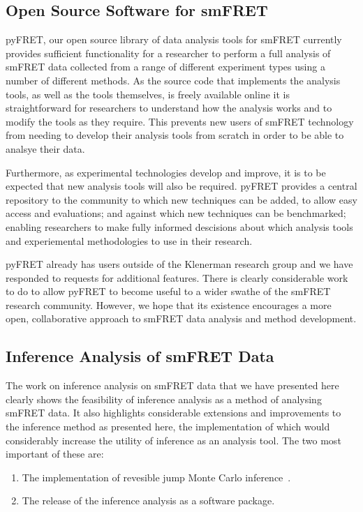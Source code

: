 \subsection{Open Source Software for smFRET}
pyFRET, our open source library of data analysis tools for smFRET currently provides sufficient functionality for a researcher to perform a full analysis of smFRET data collected from a range of different experiment types using a number of different methods. As the source code that implements the analysis tools, as well as the tools themselves, is freely available online it is straightforward for researchers to understand how the analysis works and to modify the tools as they require. This prevents new users of smFRET technology from needing to develop their analysis tools from scratch in order to be able to analsye their data. 

Furthermore, as experimental technologies develop and improve, it is to be expected that new analysis tools will also be required. pyFRET provides a central repository to the community to which new techniques can be added, to allow easy access and evaluations; and against which new techniques can be benchmarked; enabling researchers to make fully informed descisions about which analysis tools and experiemental methodologies to use in their research.

pyFRET already has users outside of the Klenerman research group and we have responded to requests for additional features. There is clearly considerable work to do to allow pyFRET to become useful to a wider swathe of the smFRET research community. However, we hope that its existence encourages a more open, collaborative approach to smFRET data analysis and method development. 

\subsection{Inference Analysis of smFRET Data}
The work on inference analysis on smFRET data that we have presented here clearly shows the feasibility of inference analysis as a method of analysing smFRET data. It also highlights considerable extensions and improvements to the inference method as presented here, the implementation of which would considerably increase the utility of inference as an analysis tool. The two most important of these are:

\begin{enumerate}
\item The implementation of revesible jump Monte Carlo inference~\cite{green1995}.
\item The release of the inference analysis as a software package.
\end{enumerate}

